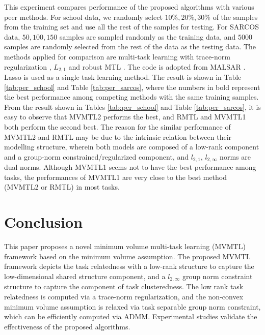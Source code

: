 \documentclass[twoside,leqno,twocolumn]{article}
\begin{document}
This experiment compares performance of the proposed algorithms with various peer methods.
For school data, we randomly select $10\%,20\%,30\%$ of the samples from the training set and use all the rest of the samples for testing. 
For SARCOS data, $50,100,150$ samples are sampled randomly as the training data, and $5000$ samples are randomly selected from the rest of the data as the testing data.
The methods applied for comparison are multi-task learning with trace-norm regularization \cite{ji2009accelerated}, $L_{2,1}$ \cite{mtl:mlj2008:argyriou2008convex} and robust MTL \cite{mtl:kdd2011:ChenZY11}. The code is adopted from MALSAR \cite{zhou2012mutal}. Lasso is used as a single task learning method. The result is shown in Table \ref{tab:per_school} and Table \ref{tab:per_sarcos}, where the numbers in bold represent the best performance among competing methods with the same training samples. From the result shown in Tables \ref{tab:per_school} and Table \ref{tab:per_sarcos}, it is easy to observe that MVMTL2 performs the best, and RMTL and MVMTL1 both perform the second best. The reason for the similar performance of MVMTL2 and RMTL may be due to the intrinsic relation between their modelling structure, wherein both models are composed of a low-rank component and a group-norm constrained/regularized component, and $l_{2,1}$, $l_{2, \infty}$ norms are dual norms. Although MVMTL1 seems not to have the best performance among tasks, the performances of MVMTL1 are very close to the best method (MVMTL2 or RMTL) in most tasks. 


\section{Conclusion}

This paper proposes a novel minimum volume multi-task learning (MVMTL) framework based on the minimum volume assumption. The proposed MVMTL framework depicts the task relatedness with a low-rank structure to capture the low-dimensional shared structure component, and a $l_{2,\infty}$ group norm constraint structure to capture the component of task clusteredness. The low rank task relatedness is computed via a trace-norm regularization, and the non-convex minimum
volume assumption is relaxed via task separable group norm constraint, which
can be efficiently computed via ADMM. Experimental studies validate the effectiveness of the proposed algorithms. 



\end{document}
